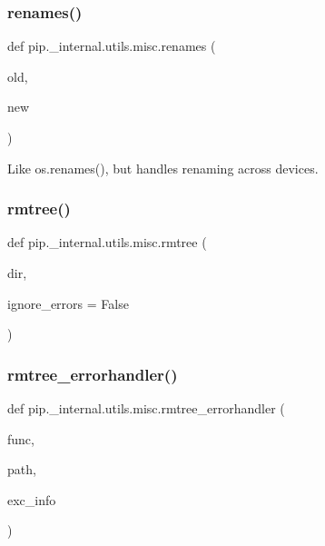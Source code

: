 \subsubsection{\texorpdfstring{renames()}{renames()}}
{\footnotesize\ttfamily def pip.\+\_\+internal.\+utils.\+misc.\+renames (\begin{DoxyParamCaption}\item[{}]{old,  }\item[{}]{new }\end{DoxyParamCaption})}

\begin{DoxyVerb}Like os.renames(), but handles renaming across devices.\end{DoxyVerb}
 \mbox{\label{namespacepip_1_1__internal_1_1utils_1_1misc_a468943eb596f19a944215297ab3b9216}} 
\subsubsection{\texorpdfstring{rmtree()}{rmtree()}}
{\footnotesize\ttfamily def pip.\+\_\+internal.\+utils.\+misc.\+rmtree (\begin{DoxyParamCaption}\item[{}]{dir,  }\item[{}]{ignore\+\_\+errors = {\ttfamily False} }\end{DoxyParamCaption})}

\mbox{\label{namespacepip_1_1__internal_1_1utils_1_1misc_a68fb568d1b03462b7bcf87103141bedb}} 
\subsubsection{\texorpdfstring{rmtree\+\_\+errorhandler()}{rmtree\_errorhandler()}}
{\footnotesize\ttfamily def pip.\+\_\+internal.\+utils.\+misc.\+rmtree\+\_\+errorhandler (\begin{DoxyParamCaption}\item[{}]{func,  }\item[{}]{path,  }\item[{}]{exc\+\_\+info }\end{DoxyParamCaption})}

